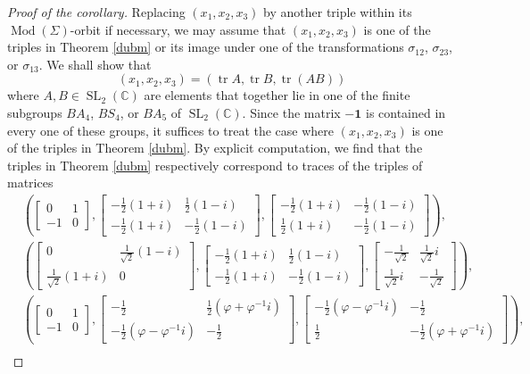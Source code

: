 \documentclass[reqno]{amsart}
\theoremstyle{plain}
\theoremstyle{definition}
\theoremstyle{remark}
\newcommand{\C}{{\mathbb{C}}}
\DeclareMathOperator{\Mod}{Mod}
\DeclareMathOperator{\SL}{SL}
\DeclareMathOperator{\tr}{tr}
\begin{document}
\begin{proof}[Proof of the corollary]
Replacing $(x_1,x_2,x_3)$ by another triple within its $\Mod(\Sigma)$-orbit if necessary, we may assume that $(x_1,x_2,x_3)$ is one of the triples in Theorem \ref{dubm} or its image under one of the transformations $\sigma_{12}$, $\sigma_{23}$, or $\sigma_{13}$. We shall show that
$$(x_1,x_2,x_3)=(\tr A,\tr B,\tr(AB))$$
where $A,B\in\SL_2(\C)$ are elements that together lie in one of the finite subgroups $B A_4$, $BS_4$, or $BA_5$ of $\SL_2(\C)$. Since the matrix $-\mathbf 1$ is contained in every one of these groups, it suffices to treat the case where $(x_1,x_2,x_3)$ is one of the triples in Theorem \ref{dubm}. By explicit computation, we find that the triples in Theorem \ref{dubm} respectively correspond to traces of the triples of matrices
\begin{align*}
&\left(\begin{bmatrix}0 & 1\\ -1 & 0\end{bmatrix},\begin{bmatrix}-\frac{1}{2}(1+i) & \frac{1}{2}(1-i)\\ -\frac{1}{2}(1+i) & -\frac{1}{2}(1-i)\end{bmatrix},\begin{bmatrix}-\frac{1}{2}(1+i) & -\frac{1}{2}(1-i)\\ \frac{1}{2}(1+i) & -\frac{1}{2}(1-i)\end{bmatrix}\right),\\
&\left(\begin{bmatrix}0 & \frac{1}{\sqrt{2}}(1-i)\\ \frac{1}{\sqrt 2}(1+i) & 0\end{bmatrix},\begin{bmatrix}-\frac{1}{2}(1+i) & \frac{1}{2}(1-i)\\ -\frac{1}{2}(1+i) & -\frac{1}{2}(1-i)\end{bmatrix},\begin{bmatrix}-\frac{1}{\sqrt 2} & \frac{1}{\sqrt 2}i\\ \frac{1}{\sqrt 2 }i & -\frac{1}{\sqrt 2}\end{bmatrix}\right),\\
&\left(\begin{bmatrix}0 & 1\\ -1 & 0\end{bmatrix},\begin{bmatrix}-\frac{1}{2} & \frac{1}{2}(\varphi+\varphi^{-1}i)\\ -\frac{1}{2}(\varphi-\varphi^{-1}i) & -\frac{1}{2}\end{bmatrix},\begin{bmatrix}-\frac{1}{2}(\varphi-\varphi^{-1}i) & -\frac{1}{2}\\ \frac{1}{2} & -\frac{1}{2}(\varphi+\varphi^{-1}i)\end{bmatrix}\right),\\

\end{align*}
\end{proof}
\end{document}
